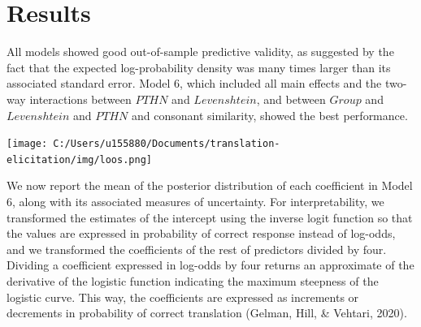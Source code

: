 \documentclass[
  english,
  man,floatsintext]{apa6}
\begin{document}
\hypertarget{results}{%
\section{Results}\label{results}}

All models showed good out-of-sample predictive validity, as suggested by the fact that the expected log-probability density was many times larger than its associated standard error. Model 6, which included all main effects and the two-way interactions between \(PTHN\) and \(Levenshtein\), and between \(Group\) and \(Levenshtein\) and \(PTHN\) and consonant similarity, showed the best performance.

\texttt{[image: C:/Users/u155880/Documents/translation-elicitation/img/loos.png]}

We now report the mean of the posterior distribution of each coefficient in Model 6, along with its associated measures of uncertainty. For interpretability, we transformed the estimates of the intercept using the inverse logit function so that the values are expressed in probability of correct response instead of log-odds, and we transformed the coefficients of the rest of predictors divided by four. Dividing a coefficient expressed in log-odds by four returns an approximate of the derivative of the logistic function indicating the maximum steepness of the logistic curve. This way, the coefficients are expressed as increments or decrements in probability of correct translation (Gelman, Hill, \& Vehtari, 2020).
\end{document}
